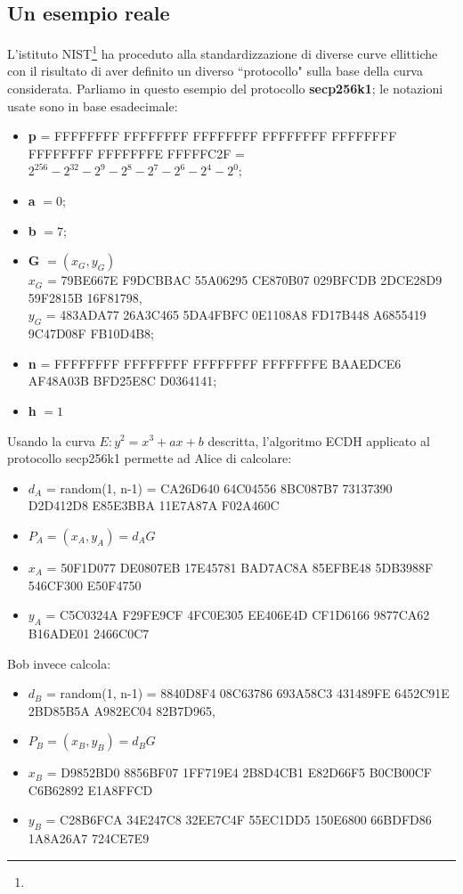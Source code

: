 \documentclass[a4paper,12pt]{tesiinfo}
\renewcommand{\footnotesize}{\fontsize{9pt}{11pt}\selectfont}
\begin{document}
\subsection{Un esempio reale}
L'istituto NIST\footnote{\footnotesize{National Institute of Standards and Technology}} ha proceduto alla standardizzazione di diverse curve ellittiche con il risultato di aver definito un diverso ``protocollo" sulla base della curva considerata. Parliamo in questo esempio del protocollo \textbf{secp256k1}; le notazioni usate sono in base esadecimale:
\begin{itemize}
 \item \textbf{p} = FFFFFFFF FFFFFFFF FFFFFFFF FFFFFFFF FFFFFFFF FFFFFFFF FFFFFFFE FFFFFC2F = $2^{256} - 2^{32}-2^9-2^8-2^7-2^6-2^4-2^0$;
 
 \item \textbf{a} $=0$;
 
 \item \textbf{b} $=7$;
 
 \item \textbf{G} $= (x_G, y_G)$
 \\
 $x_G$ = 79BE667E F9DCBBAC 55A06295 CE870B07 029BFCDB 2DCE28D9 59F2815B 16F81798,
 \\
 $y_G$ = 483ADA77 26A3C465 5DA4FBFC 0E1108A8 FD17B448 A6855419 9C47D08F FB10D4B8;
 
 \item \textbf{n} = FFFFFFFF FFFFFFFF FFFFFFFF FFFFFFFE BAAEDCE6 AF48A03B BFD25E8C D0364141;
 
 \item \textbf{h} $ = 1$
\end{itemize}
Usando la curva $E : y^2 = x^3+ax+b$ descritta, l'algoritmo ECDH applicato al protocollo secp256k1 permette ad Alice di calcolare:
\begin{itemize}

\item $d_A$ = random(1, n-1) = CA26D640 64C04556 8BC087B7 73137390 D2D412D8 E85E3BBA 11E7A87A F02A460C

\item $P_A = (x_A, y_A) = d_AG$

\item $x_A$ = 50F1D077 DE0807EB 17E45781 BAD7AC8A 85EFBE48 5DB3988F 546CF300 E50F4750

\item $y_A$ = C5C0324A F29FE9CF 4FC0E305 EE406E4D CF1D6166 9877CA62 B16ADE01 2466C0C7
\end{itemize}
Bob invece calcola:
\begin{itemize}
\item $d_B$ = random(1, n-1) = 8840D8F4 08C63786 693A58C3 431489FE 6452C91E 2BD85B5A A982EC04 82B7D965,

\item $P_B = (x_B, y_B) = d_BG$

\item $x_B$ = D9852BD0 8856BF07 1FF719E4 2B8D4CB1 E82D66F5 B0CB00CF C6B62892 E1A8FFCD

\item $y_B$ = C28B6FCA 34E247C8 32EE7C4F 55EC1DD5 150E6800 66BDFD86 1A8A26A7 724CE7E9
\end{itemize}
\end{document}

